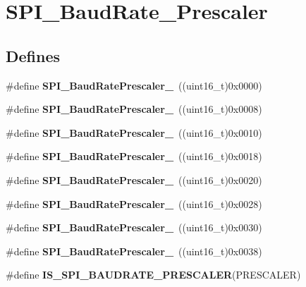 \hypertarget{group__SPI__BaudRate__Prescaler}{
\section{SPI\_\-BaudRate\_\-Prescaler}
\label{group__SPI__BaudRate__Prescaler}
}
\subsection*{Defines}
\begin{DoxyCompactItemize}
\item 
\hypertarget{group__SPI__BaudRate__Prescaler_ga88cd6d416c87b382396dbf4c02e3bd4b}{
\#define {\bfseries SPI\_\-BaudRatePrescaler\_}~((uint16\_\-t)0x0000)}
\label{group__SPI__BaudRate__Prescaler_ga88cd6d416c87b382396dbf4c02e3bd4b}

\item 
\hypertarget{group__SPI__BaudRate__Prescaler_ga17ac4858cb9387289ee7c3d94a9b54be}{
\#define {\bfseries SPI\_\-BaudRatePrescaler\_}~((uint16\_\-t)0x0008)}
\label{group__SPI__BaudRate__Prescaler_ga17ac4858cb9387289ee7c3d94a9b54be}

\item 
\hypertarget{group__SPI__BaudRate__Prescaler_ga023a1e4c04586f2feb0d4b03b2e0c230}{
\#define {\bfseries SPI\_\-BaudRatePrescaler\_}~((uint16\_\-t)0x0010)}
\label{group__SPI__BaudRate__Prescaler_ga023a1e4c04586f2feb0d4b03b2e0c230}

\item 
\hypertarget{group__SPI__BaudRate__Prescaler_ga5ef8587bb96e3ec98e9fde770756fc7d}{
\#define {\bfseries SPI\_\-BaudRatePrescaler\_}~((uint16\_\-t)0x0018)}
\label{group__SPI__BaudRate__Prescaler_ga5ef8587bb96e3ec98e9fde770756fc7d}

\item 
\hypertarget{group__SPI__BaudRate__Prescaler_ga1d30cecaa412cee5250c69644207c652}{
\#define {\bfseries SPI\_\-BaudRatePrescaler\_}~((uint16\_\-t)0x0020)}
\label{group__SPI__BaudRate__Prescaler_ga1d30cecaa412cee5250c69644207c652}

\item 
\hypertarget{group__SPI__BaudRate__Prescaler_ga2c9cd96ed56432a83f8e4f46fbecb5e6}{
\#define {\bfseries SPI\_\-BaudRatePrescaler\_}~((uint16\_\-t)0x0028)}
\label{group__SPI__BaudRate__Prescaler_ga2c9cd96ed56432a83f8e4f46fbecb5e6}

\item 
\hypertarget{group__SPI__BaudRate__Prescaler_gafa6c39c3ee16a08730356a5cd30f3648}{
\#define {\bfseries SPI\_\-BaudRatePrescaler\_}~((uint16\_\-t)0x0030)}
\label{group__SPI__BaudRate__Prescaler_gafa6c39c3ee16a08730356a5cd30f3648}

\item 
\hypertarget{group__SPI__BaudRate__Prescaler_ga1e1aa6406f0e88ac557ba49fb8069e3e}{
\#define {\bfseries SPI\_\-BaudRatePrescaler\_}~((uint16\_\-t)0x0038)}
\label{group__SPI__BaudRate__Prescaler_ga1e1aa6406f0e88ac557ba49fb8069e3e}

\item 
\#define {\bfseries IS\_\-SPI\_\-BAUDRATE\_\-PRESCALER}(PRESCALER)
\end{DoxyCompactItemize}


